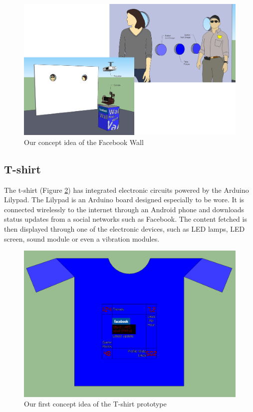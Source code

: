 \begin{figure}[h!]
\centering \includegraphics[scale=0.22]{img/prestudies-facebookwall} \caption{Our concept idea of the Facebook Wall}

\label{fig:prestudies-facebookwall}
\end{figure}

\newpage

\subsection{T-shirt}
The t-shirt (Figure \ref{fig:prestudies-tshirt})  has integrated electronic circuits powered by the Arduino Lilypad.
The Lilypad is an Arduino board designed especially to be wore.
It is connected wirelessly to the internet through an Android phone and downloads status updates from a social
networks such as Facebook. The content fetched is then displayed through one of the electronic devices, such as LED lamps,
LED screen, sound module or even a vibration modules.

\begin{figure}[h!]
\centering \includegraphics[scale=0.35]{img/prestudies-tshirt} \caption{Our first concept idea of the T-shirt prototype}

\label{fig:prestudies-tshirt}
\end{figure}

